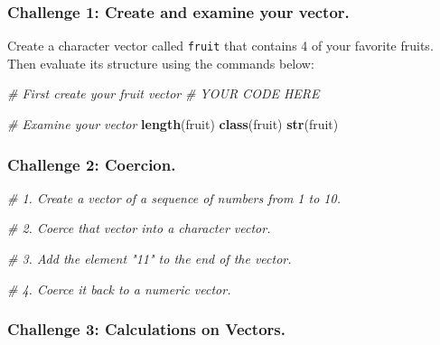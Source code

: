 \documentclass[
]{book}
\newenvironment{Shaded}{\begin{snugshade}}{\end{snugshade}}
\newcommand{\CommentTok}[1]{\textcolor[rgb]{0.56,0.35,0.01}{\textit{#1}}}
\newcommand{\KeywordTok}[1]{\textcolor[rgb]{0.13,0.29,0.53}{\textbf{#1}}}
\newcommand{\NormalTok}[1]{#1}
\begin{document}
\hypertarget{challenge-1-create-and-examine-your-vector.}{%
\subsubsection*{Challenge 1: Create and examine your vector.}\label{challenge-1-create-and-examine-your-vector.}}

Create a character vector called \texttt{fruit} that contains 4 of your favorite fruits. Then evaluate its structure using the commands below:

\begin{Shaded}
\begin{Highlighting}[]

\CommentTok{# First create your fruit vector }
\CommentTok{# YOUR CODE HERE}


\CommentTok{# Examine your vector}
\KeywordTok{length}\NormalTok{(fruit)}
\KeywordTok{class}\NormalTok{(fruit)}
\KeywordTok{str}\NormalTok{(fruit)}
\end{Highlighting}
\end{Shaded}

\hypertarget{challenge-2-coercion.}{%
\subsubsection*{Challenge 2: Coercion.}\label{challenge-2-coercion.}}

\begin{Shaded}
\begin{Highlighting}[]

\CommentTok{# 1. Create a vector of a sequence of numbers from 1 to 10.}

\CommentTok{# 2. Coerce that vector into a character vector.}

\CommentTok{# 3. Add the element "11" to the end of the vector.}

\CommentTok{# 4. Coerce it back to a numeric vector.}
\end{Highlighting}
\end{Shaded}

\hypertarget{challenge-3-calculations-on-vectors.}{%
\subsubsection*{Challenge 3: Calculations on Vectors.}\label{challenge-3-calculations-on-vectors.}}
\end{document}
